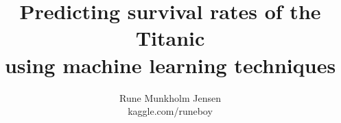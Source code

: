 \documentclass[11.5pt]{article}
\newenvironment{colfigure} {
		\par\medskip\noindent\minipage{\linewidth}
	} {
		\endminipage\par\medskip
	}
\def\datapath{../data}
\begin{document}
	

\title{
	Predicting survival rates of the Titanic \\using machine learning techniques\\}
\author{
	Rune Munkholm Jensen\\kaggle.com/runeboy\\
}
\date{}

\maketitle



			
\newpage
%			

\twocolumn
			

\newcommand{\dataFigure}[3][width=0.75\linewidth]{
	\begin{colfigure}
		\centering
		\texttt{[image: \\datapath/image/\#2]}
\captionof{figure}{\small #3}
		\label{fig:#2}
	\end{colfigure}
}			
\newcommand{\fullWidthDataFigure}[3][width=0.75\linewidth]{
	\begin{figure*}
		\centering
		\texttt{[image: \\datapath/image/\#2]}
		\captionof{figure}{\small #3}
		\label{fig:#2}
	\end{figure*}
}			





%
\end{document}
